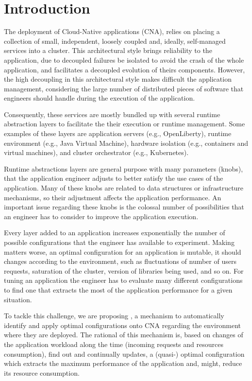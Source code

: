 \section{Introduction}

The deployment of Cloud-Native applications (CNA), relies on placing a collection of small, independent, loosely
coupled and, ideally, self-managed services into a cluster. This architectural style brings reliability to the
application, due to decoupled failures be isolated to avoid the crash of the whole application, and facilitates a
decoupled evolution of theirs components. However, the high decoupling in this architectural style makes difficult the
application management, considering the large number of distributed pieces of software that engineers should handle
during the execution of the application.

Consequently, these services are mostly bundled up with several runtime abstraction layers to facilitate the their
execution or runtime management. Some examples of these layers are application servers (e.g., OpenLiberty), runtime
environment (e.g., Java Virtual Machine), hardware isolation (e.g., containers and virtual machines), and cluster
orchestrator (e.g., Kubernetes).

Runtime abstractions layers are general purpose with many parameters (knobs), that the application engineer adjusts to
better satisfy the use cases of the application. Many of these knobs are related to data structures or infrastructure
mechanisms, so their adjustment affects the application performance. An important issue regarding these knobs is the
colossal number of possibilities that an engineer has to consider to improve the application execution.

Every layer added to an application increases exponentially the number of possible configurations that the engineer has
available to experiment. Making matters worse, an optimal configuration for an application is mutable, it should
changes according to the environment, such as fluctuations of number of users requests, saturation of the cluster,
version of libraries being used, and so on. For tuning an application the engineer has to evaluate many different
configurations to find one that extracts the most of the application performance for a given situation.

To tackle this challenge, we are proposing \name, a mechanism to automatically identify and apply optimal
configurations onto CNA regarding the environment where they are deployed. The rational of this mechanism is, based on
changes of the application workload along the time (incoming requests and resources consumption), find out and
continually updates, a (quasi-) optimal configuration which extracts the maximum performance of the application and,
might, reduce its resource consumption.

